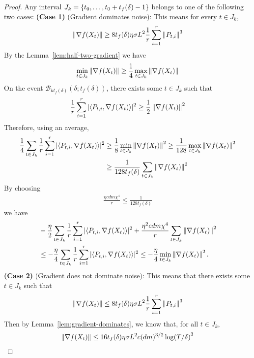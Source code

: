 \begin{proof}
    Any interval $J_k = \left\{t_0, \ldots, t_0+t_f(\delta)-1\right\}$ belongs to one of the following two cases:
    \textbf{(Case 1)} (Gradient dominates noise): This means for every $t \in J_k$,
    \begin{align*}
        \left\lVert \nabla f(X_t) \right\rVert \geq 8t_f(\delta) \eta \sigma L^2 \frac 1r \sum_{i=1}^r \left\lVert P_{t,i} \right\rVert^3
    \end{align*}
    By the Lemma~\ref{lem:half-two-gradient}
    we have
    \begin{align*}
        \min_{t \in J_k} \left\lVert \nabla f(X_t) \right\rVert \geq \frac 14 \max_{t \in J_k} \left\lVert \nabla f(X_t) \right\rVert
    \end{align*}
    On the event $\mathcal B_{kt_f(\delta)}(\delta ; t_f(\delta))$, there exists some $t \in J_k$ such that 
    \begin{align*}
        \frac 1r \sum_{i=1}^r |\langle P_{t,i}, \nabla f(X_t) \rangle|^2 \geq \frac 12 \left\lVert \nabla f(X_t) \right\rVert^2
    \end{align*}
    Therefore, using an average,
    \begin{align*}
        \frac 14 \sum_{t \in J_k} \frac 1r \sum_{i=1}^r |\langle P_{t,i}, \nabla f(X_t) \rangle|^2 &\geq \frac 18 \min_{t \in J_k} \left\lVert \nabla f(X_t) \right\rVert^2 \geq \frac{1}{128} \max_{t \in J_k} \left\lVert \nabla f(X_t) \right\rVert^2
        \\& \geq \frac{1}{128t_f(\delta)} \sum_{t\in J_k} \left\lVert \nabla f(X_t) \right\rVert^2
    \end{align*}
    By choosing 
    \begin{align*}
        \frac{\eta cdm \chi^4}{r} \leq \frac{1}{128 t_f(\delta)}
    \end{align*}
    we have
    \begin{align*}
        &-\frac{\eta}{2} \sum_{t \in J_k} \frac 1r \sum_{i=1}^r |\langle P_{t,i}, \nabla f(X_t) \rangle|^2 + \frac{\eta^2 cdm \chi^4}{r}\sum_{t \in J_k} \left\lVert \nabla f(X_t) \right\rVert^2 \\
        &\leq -\frac{\eta}{4} \sum_{t \in J_k} \frac 1r \sum_{i=1}^r |\langle P_{t,i}, \nabla f(X_t) \rangle|^2 \leq -\frac{\eta}{4} \min_{t \in J_k} \left\lVert \nabla f(X_t) \right\rVert^2.
    \end{align*}
    \textbf{(Case 2)} (Gradient does not dominate noise): This means that there exists some $t \in J_k$ such that
    \begin{align*}
        \left\lVert \nabla f(X_t) \right\rVert \leq 8t_f(\delta) \eta \sigma L^2 \frac 1r \sum_{i=1}^r \left\lVert P_{t,i} \right\rVert^3
    \end{align*}
    Then by Lemma~\ref{lem:gradient-dominates}, we know that, for all $t \in J_k$,
    \begin{align*}
        \left\lVert \nabla f(X_t) \right\rVert \leq 16 t_f(\delta) \eta \sigma L^2 c(dm)^{3/2} \log(T/\delta)^3
    \end{align*}


\end{proof}
